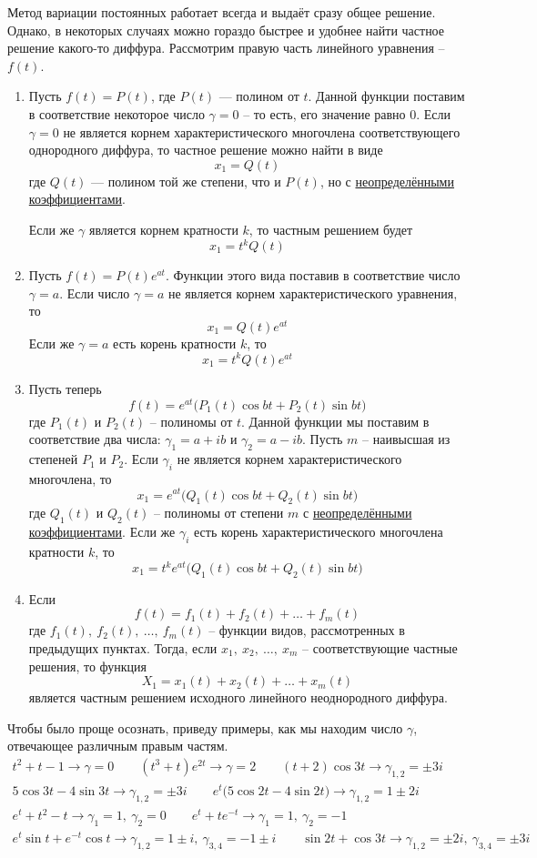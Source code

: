 \documentclass[a4paper,12pt]{article}
\renewcommand{\to}{\longrightarrow}
\begin{document}
Метод вариации постоянных работает всегда и выдаёт сразу общее решение. Однако, в некоторых случаях 
можно гораздо быстрее и удобнее найти частное решение какого-то диффура. Рассмотрим правую часть линейного уравнения -- $f(t)$.
\begin{enumerate}
	\item Пусть $f(t) = P(t)$, где $P(t)$ --- полином от $t$. Данной функции поставим в соответствие некоторое число $\gamma = 0$ -- то есть, его значение равно 0. Если $\gamma = 0$ не является корнем характеристического многочлена соответствующего однородного диффура, то частное решение можно найти в виде 
	\[x_1 = Q(t)\] где $Q(t)$ --- полином той же степени, что и $P(t)$, но с \underline{неопределёнными коэффициентами}. 
	
	Если же $\gamma$ является корнем кратности $k$, то частным решением будет \[x_1 = t^kQ(t)\]
	
	\item Пусть $f(t) = P(t)e^{at}$. Функции этого вида поставив в соответствие число $\gamma = a$. Если число $\gamma = a$ не является корнем характеристического уравнения, то
	\[x_1 = Q(t)e^{at}\]
	Если же $\gamma  = a$ есть корень кратности $k$, то 
	\[x_1 = t^kQ(t)e^{at}\]
	
	\item Пусть теперь 
	\[f(t) = e^{at}\big(P_1(t)\cos bt + P_2(t)\sin bt\big)\] где $P_1(t)$ и $P_2(t)$ -- полиномы от $t$. Данной функции мы поставим в соответствие два числа: $\gamma_1 = a + ib$ и $\gamma_2 = a - ib$. Пусть $m$ -- наивысшая из степеней $P_1$ и $P_2$. Если $\gamma_i$ не является корнем характеристического многочлена, то
	\[x_1 = e^{at}\big(Q_1(t)\cos bt + Q_2(t)\sin bt\big)\] где $Q_1(t)$ и $Q_2(t)$ -- полиномы от степени $m$ с \underline{неопределёнными коэффициентами}. Если же $\gamma_i$ есть корень характеристического многочлена кратности $k$, то 
	\[x_1 = t^ke^{at}\big(Q_1(t)\cos bt + Q_2(t)\sin bt\big)\]
	
	\item Если 
	\[f(t) = f_1(t) + f_2(t) + \ldots + f_m(t)\] где $f_1(t),\ f_2(t),\ \ldots,\ f_m(t)$ -- функции видов, рассмотренных в предыдущих пунктах. Тогда, если $x_1,\ x_2,\ \ldots,\ x_m$ -- соответствующие частные решения, то функция
	\[X_1 = x_1(t) + x_2(t) + \ldots + x_m(t)\]
	является частным решением исходного линейного неоднородного диффура.
\end{enumerate}
Чтобы было проще осознать, приведу примеры, как мы находим число $\gamma$, отвечающее различным правым частям.
\begin{gather*}
t^2 + t - 1 \to \gamma = 0 \qquad (t^3 + t)e^{2t} \to \gamma = 2 \qquad (t + 2)\cos 3t \to \gamma_{1,2} = \pm 3i\\
5\cos 3t - 4\sin 3t \to \gamma_{1,2} = \pm 3i \qquad e^{t}\big(5\cos 2t - 4\sin 2t\big) \to \gamma_{1,2} = 1 \pm 2i \\
e^t + t^2 - t  \to \gamma_1 = 1,\ \gamma_2  = 0\qquad e^t + te^{-t} \to \gamma_1 = 1,\ \gamma_2 = -1\\
e^t\sin t + e^{-t}\cos t \to \gamma_{1,2} = 1 \pm i,\ \gamma_{3,4} = -1 \pm i\qquad \sin 2t + \cos 3t \to \gamma_{1,2} = \pm 2i,\ \gamma_{3,4} = \pm 3i
\end{gather*}
\end{document}
